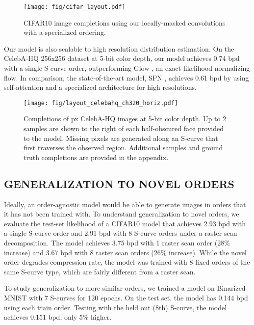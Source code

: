 \documentclass[letterpaper]{article}
\begin{document}
\begin{figure}[t]
	\centering
    \texttt{[image: fig/cifar\_layout.pdf]}
    \vspace{-6mm}
	\caption{CIFAR10 image completions using our locally-masked convolutions with a specialized ordering.}
	\label{fig:cifar_inpainting}
	\vspace{-2mm}
\end{figure}

Our model is also scalable to high resolution distribution estimation. On the CelebA-HQ 256x256 dataset at 5-bit color depth, our model achieves 0.74 bpd with a single S-curve order, outperforming Glow \citep{kingma2018glow}, an exact likelihood normalizing flow. In comparison, the state-of-the-art model, SPN \citep{menick2018generating}, achieves 0.61 bpd by using self-attention and a specialized architecture for high resolutions.

\begin{figure*}[t]
	\centering
	\texttt{[image: fig/layout\_celebahq\_ch320\_horiz.pdf]}
	\vspace{-7mm}
	\caption{Completions of  px CelebA-HQ images at 5-bit color depth. Up to 2 samples are shown to the right of each half-obscured face provided to the model. Missing pixels are generated along an S-curve that first traverses the observed region. Additional samples and ground truth completions are provided in the appendix.}
	\label{fig:celebahq_inpainting_more}
\end{figure*}

\subsection{GENERALIZATION TO NOVEL ORDERS}

Ideally, an order-agnostic model would be able to generate images in orders that it has not been trained with.
To understand generalization to novel orders, we evaluate the test-set likelihood of a CIFAR10 model that achieves 2.93 bpd with a single S-curve order and 2.91 bpd with 8 S-curve orders under a raster scan decomposition. The model achieves 3.75 bpd with 1 raster scan order (28\% increase) and 3.67 bpd with 8 raster scan orders (26\% increase). While the novel order degrades compression rate, the model was trained with 8 fixed orders of the same S-curve type, which are fairly different from a raster scan.

To study generalization to more similar orders, we trained a model on Binarized MNIST with 7 S-curves for 120 epochs. On the test set, the model has 0.144 bpd using each train order. Testing with the held out (8th) S-curve, the model achieves 0.151 bpd, only 5\% higher.
\end{document}
